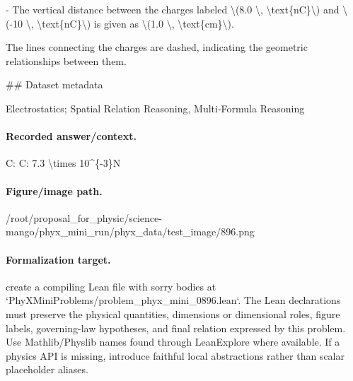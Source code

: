 - The vertical distance between the charges labeled \textbackslash{}(8.0 \textbackslash{}, \textbackslash{}text\{nC\}\textbackslash{}) and \textbackslash{}(-10 \textbackslash{}, \textbackslash{}text\{nC\}\textbackslash{}) is given as \textbackslash{}(1.0 \textbackslash{}, \textbackslash{}text\{cm\}\textbackslash{}).

The lines connecting the charges are dashed, indicating the geometric relationships between them.

\#\# Dataset metadata

Electrostatics; Spatial Relation Reasoning, Multi-Formula Reasoning

\paragraph{Recorded answer/context.}
C: C: 7.3 \textbackslash{}times 10\textasciicircum{}\{-3\}N

\paragraph{Figure/image path.}
/root/proposal\_for\_physic/science-mango/phyx\_mini\_run/phyx\_data/test\_image/896.png

\paragraph{Formalization target.}
create a compiling Lean file with sorry bodies at `PhyXMiniProblems/problem\_phyx\_mini\_0896.lean`. The Lean declarations must preserve the physical quantities, dimensions or dimensional roles, figure labels, governing-law hypotheses, and final relation expressed by this problem.
Use Mathlib/Physlib names found through LeanExplore where available. If a physics API is missing, introduce faithful local abstractions rather than scalar placeholder aliases.

